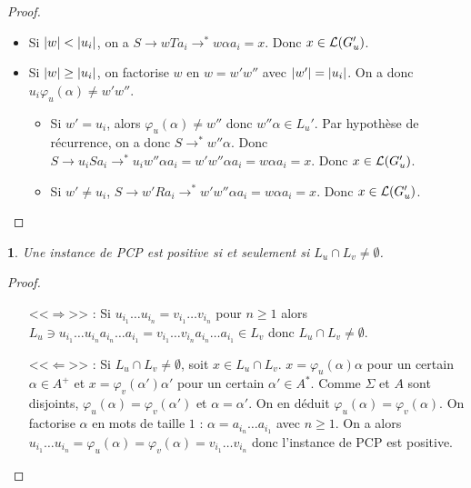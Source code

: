 \documentclass[11pt,a4paper]{article}
\theoremstyle{plain}
\theoremstyle{definition}
\theoremstyle{definition}
\theoremstyle{remark}
\theoremstyle{remark}
\theoremstyle{plain}
\newtheorem{lem}[thm]{\protect\lemmaname}
\theoremstyle{plain}
\theoremstyle{plain}
\theoremstyle{remark}
\providecommand{\lemmaname}{Lemme}
\begin{document}
\begin{proof}
\begin{itemize}
\begin{itemize}
			\begin{itemize}
				\item Si $\left|w\right|<\left|u_i\right|$, on a $S\to wTa_i\to^* w\alpha a_i=x$. Donc $x\in \mathcal{L}(G_u')$.
				\item Si $\left|w\right|\ge \left|u_i\right|$, on factorise $w$ en $w=w'w''$ avec $\left|w'\right|=\left|u_i\right|$. On a donc $u_i\varphi_u(\alpha)\not= w'w''$.
				\begin{itemize}
					\item Si $w'=u_i$, alors $\varphi_u(\alpha)\not=w''$ donc $w''\alpha\in L_u'$. Par hypothèse de récurrence, on a donc $S\to^* w''\alpha$. Donc $S\to u_iSa_i\to^*u_i w''\alpha a_i=w'w''\alpha a_i=w\alpha a_i = x$. Donc $x\in \mathcal{L}(G_u')$.
					\item Si $w'\not= u_i$, $S\to w'Ra_i\to^* w'w''\alpha a_i=w\alpha a_i = x$. Donc $x\in \mathcal{L}(G_u')$.
				\end{itemize}
			\end{itemize}
		\end{itemize}
	\end{itemize}
\end{proof}

\begin{lem}
	Une instance de PCP est positive si et seulement si $L_u\cap L_v\not= \emptyset$.
\end{lem}

\begin{proof}
	\begin{itemize}
		\item[<<$\Rightarrow$>>] : Si $u_{i_1}\dots u_{i_n}=v_{i_1}\dots v_{i_n}$ pour $n\ge 1$ alors $L_u\ni u_{i_1}\dots u_{i_n}a_{i_n}\dots a_{i_1}=v_{i_1}\dots v_{i_n}a_{i_n}\dots a_{i_1}\in L_v$ donc $L_u\cap L_v \not= \emptyset$.
		\item[<<$\Leftarrow$>>] : Si $L_u\cap L_v \not= \emptyset$, soit $x\in L_u\cap L_v$. $x = \varphi_u(\alpha)\alpha$ pour un certain $\alpha \in A^+$ et $x = \varphi_v(\alpha')\alpha'$ pour un certain $\alpha'\in A^*$. Comme $\Sigma$ et $A$ sont disjoints, $\varphi_u(\alpha)=\varphi_v(\alpha')$ et $\alpha=\alpha'$. On en déduit $\varphi_u(\alpha)=\varphi_v(\alpha)$. On factorise $\alpha$ en mots de taille $1$ : $\alpha = a_{i_n}\dots a_{i_1}$ avec $n\ge 1$. On a alors $u_{i_1}\dots u_{i_n}=\varphi_u(\alpha)=\varphi_v(\alpha)=v_{i_1}\dots v_{i_n}$ donc l'instance de PCP est positive.
	\end{itemize}
\end{proof}
\end{document}
